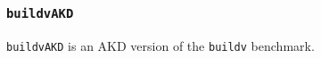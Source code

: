 \subsubsection{\tt buildvAKD}
\label{benchmarkbuildvakd}

{\tt buildvAKD} is an AKD version of the {\tt buildv} benchmark.
